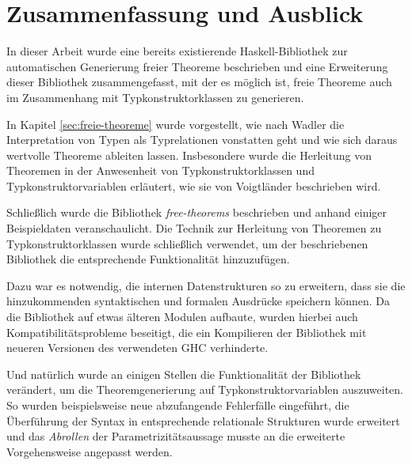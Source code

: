\section{Zusammenfassung und Ausblick}

In dieser Arbeit wurde eine bereits existierende Haskell-Bibliothek zur automatischen Generierung freier Theoreme
beschrieben und eine Erweiterung dieser Bibliothek zusammengefasst, mit der es möglich ist, freie Theoreme auch im Zusammenhang
mit Typkonstruktorklassen zu generieren.

In Kapitel \ref{sec:freie-theoreme} wurde vorgestellt, wie nach Wadler \cite{wadler} die Interpretation von Typen als Typrelationen
vonstatten geht und wie sich daraus wertvolle Theoreme ableiten lassen. Insbesondere wurde die Herleitung von Theoremen
in der Anwesenheit von Typkonstruktorklassen und Typkonstruktorvariablen erläutert, wie sie von Voigtländer \cite{voigtlander}
beschrieben wird.

Schließlich wurde die Bibliothek \textit{free-theorems} \cite{freetheorems} beschrieben und anhand einiger Beispieldaten
veranschaulicht. Die Technik zur Herleitung von Theoremen zu Typkonstruktorklassen wurde schließlich verwendet, um der
beschriebenen Bibliothek die entsprechende Funktionalität hinzuzufügen.

Dazu war es notwendig, die internen Datenstrukturen so zu erweitern, dass sie die hinzukommenden syntaktischen und formalen
Ausdrücke speichern können. Da die Bibliothek auf etwas älteren Modulen aufbaute, wurden hierbei auch
Kompatibilitätsprobleme beseitigt, die ein Kompilieren der Bibliothek mit neueren Versionen des verwendeten GHC verhinderte.


Und natürlich wurde an einigen Stellen die Funktionalität der Bibliothek verändert, um die Theoremgenerierung auf
Typkonstruktorvariablen auszuweiten. So wurden beispielsweise neue abzufangende Fehlerfälle eingeführt, die
Überführung der Syntax in entsprechende relationale Strukturen wurde erweitert und das \textit{Abrollen} der
Parametrizitätsaussage musste an die erweiterte Vorgehensweise angepasst werden.

